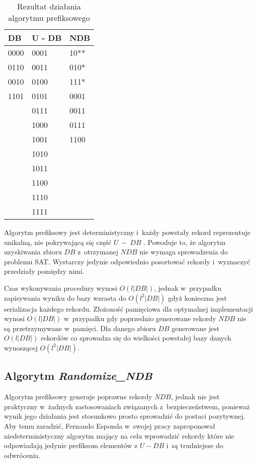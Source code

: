 \begin{table}[h]
    \centering
    \begin{tabular}{|l|l|l|}
        \hline
        DB   & U - DB & NDB  \\ \hline
        0000 & 0001   & 10** \\
        0110 & 0011   & 010* \\
        0010 & 0100   & 111* \\
        1101 & 0101   & 0001 \\
        & 0111   & 0011 \\
        & 1000   & 0111 \\
        & 1001   & 1100 \\
        & 1010   &      \\
        & 1011   &      \\
        & 1100   &      \\
        & 1110   &      \\
        & 1111   &      \\ \hline
    \end{tabular}
    \caption{Rezultat działania algorytmu prefiksowego}
    \label{tbl:prefix_results}
\end{table}



Algorytm prefiksowy jest deterministyczny i~każdy powstały rekord reprezentuje unikalną, nie pokrywającą się część $U~-~DB$ \cite{NRI-Esponda}.
Powoduje to, że algorytm uzyskiwania zbioru $DB$ z~otrzymanej $NDB$ nie wymaga sprowadzenia do problemu SAT. Wystarczy jedynie odpowiednio posortować rekordy i~wyznaczyć przedziały pomiędzy nimi.

Czas wykonywania procedury wynosi $O(l|DB|)$, jednak w~przypadku zapisywania wyniku do bazy wzrasta do $O(l^2|DB|)$ gdyż konieczna jest serializacja każdego rekordu.
Złożoność pamięciowa dla optymalnej implementacji wynosi $O(l|DB|)$ w~przypadku gdy poprzednio generowane rekordy $NDB$ nie są przetrzymywane w~pamięci. 
Dla danego zbioru $DB$ generowane jest $O(l|DB|)$ rekordów co sprowadza się do wielkości powstałej bazy danych wynoszącej $O(l^2|DB|)$.
\subsection{Algorytm \textit{Randomize\_NDB}}
Algorytm prefiksowy generuje poprawne rekordy $NDB$, jednak nie jest praktyczny w~żadnych zastosowaniach związanych
z~bezpieczeństwem, ponieważ wynik jego działania jest stosunkowo prosto sprowadzić do postaci pozytywnej. 
Aby temu zaradzić, Fernando Esponda w~swojej pracy\cite{NRI-Esponda} zaproponował 
niedeterministyczny algorytm mający na celu wprowadzić rekordy które nie odpowiadają jedynie prefiksom elementów
z $U - DB$ i~są trudniejsze do odwrócenia.


